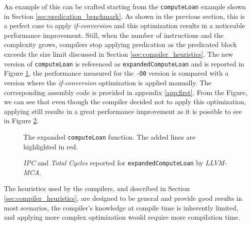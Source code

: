 An example of this can be crafted starting from the \texttt{computeLoan} example shown in Section \ref{sec:predication_benchmark}. As shown in the previous section, this is a perfect case to apply \textit{if-conversion} and this optimization results in a noticeable performance improvement.
Still, when the number of instructions and the complexity grows, compilers stop applying predication as the predicated block exceeds the size limit discussed in Section \ref{sec:compiler_heuristics}. The new version of  \texttt{computeLoan} is referenced as \texttt{expandedComputeLoan} and is reported in Figure \ref{lst:expanded_compute_loan}, the performance measured for the \texttt{-O0} version is compared with a version where the \textit{if-conversion} optimization is applied manually. The corresponding assembly code is provided in appendix \ref{app:first}. From the Figure, we can see that even though the compiler decided not to apply this optimization, applying still results in a great performance improvement as it is possible to see in Figure \ref{fig:compute_loan_ipc}.

\begin{figure}[h]
    
    \caption{The expanded \texttt{computeLoan} function. The added lines are highlighted in red.}
    \label{lst:expanded_compute_loan}
\end{figure}

\begin{figure}[h]
    
    \caption{\textit{IPC} and \textit{Total Cycles} reported for \texttt{expandedComputeLoan} by \textit{LLVM-MCA}.}
    \label{fig:compute_loan_ipc}
\end{figure}

The heuristics used by the compilers, and described in Section \ref{sec:compiler_heuristics}, are designed to be general and provide good results in most scenarios, the compiler's knowledge at compile time is inherently limited, and applying more complex optimization would require more compilation time.

\newpage